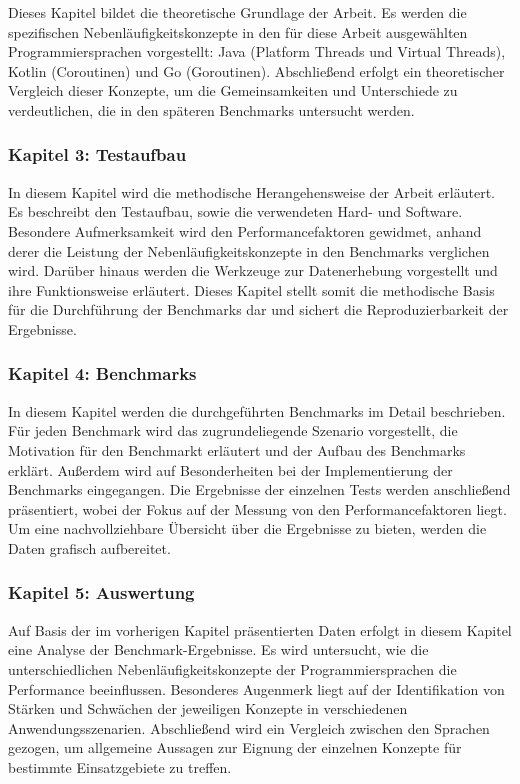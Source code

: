 \documentclass[fontsize=12pt,paper=a4,twoside=semi,parskip=half-,headsepline,headinclude]{scrreprt}
\begin{document}
Dieses Kapitel bildet die theoretische Grundlage der Arbeit. Es werden die spezifischen Nebenläufigkeitskonzepte in den für diese Arbeit ausgewählten Programmiersprachen vorgestellt: Java (Platform Threads und Virtual Threads), Kotlin (Coroutinen) und Go (Goroutinen). Abschließend erfolgt ein theoretischer Vergleich dieser Konzepte, um die Gemeinsamkeiten und Unterschiede zu verdeutlichen, die in den späteren Benchmarks untersucht werden.

\subsubsection{Kapitel 3: Testaufbau}

In diesem Kapitel wird die methodische Herangehensweise der Arbeit erläutert. Es beschreibt den Testaufbau, sowie die verwendeten Hard- und Software. Besondere Aufmerksamkeit wird den Performancefaktoren gewidmet, anhand derer die Leistung der Nebenläufigkeitskonzepte in den Benchmarks verglichen wird. Darüber hinaus werden die Werkzeuge zur Datenerhebung vorgestellt und ihre Funktionsweise erläutert. Dieses Kapitel stellt somit die methodische Basis für die Durchführung der Benchmarks dar und sichert die Reproduzierbarkeit der Ergebnisse.

\subsubsection{Kapitel 4: Benchmarks}

In diesem Kapitel werden die durchgeführten Benchmarks im Detail beschrieben. Für jeden Benchmark wird das zugrundeliegende Szenario vorgestellt, die Motivation für den Benchmarkt erläutert und der Aufbau des Benchmarks erklärt. Außerdem wird auf Besonderheiten bei der Implementierung der Benchmarks eingegangen. Die Ergebnisse der einzelnen Tests werden anschließend präsentiert, wobei der Fokus auf der Messung von den Performancefaktoren liegt. Um eine nachvollziehbare Übersicht über die Ergebnisse zu bieten, werden die Daten grafisch aufbereitet.

\subsubsection{Kapitel 5: Auswertung}

Auf Basis der im vorherigen Kapitel präsentierten Daten erfolgt in diesem Kapitel eine Analyse der Benchmark-Ergebnisse. Es wird untersucht, wie die unterschiedlichen Nebenläufigkeitskonzepte der Programmiersprachen die Performance beeinflussen. Besonderes Augenmerk liegt auf der Identifikation von Stärken und Schwächen der jeweiligen Konzepte in verschiedenen Anwendungsszenarien. Abschließend wird ein Vergleich zwischen den Sprachen gezogen, um allgemeine Aussagen zur Eignung der einzelnen Konzepte für bestimmte Einsatzgebiete zu treffen.
\end{document}

